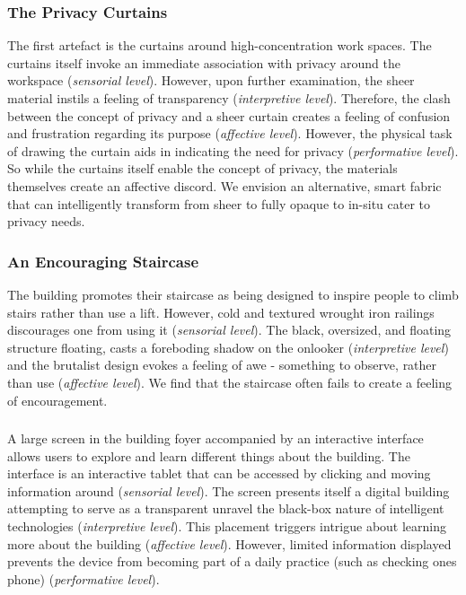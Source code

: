 \documentclass[manuscript, anonymous, review]{acmart}
\begin{document}
\subsubsection*{The Privacy Curtains}
The first artefact is the curtains around high-concentration work spaces. The curtains itself invoke an immediate association with privacy around the workspace (\textit{sensorial level}). However, upon further examination, the sheer material instils a feeling of transparency (\textit{interpretive level}). Therefore, the clash between the concept of privacy and a sheer curtain creates a feeling of confusion and frustration regarding its purpose (\textit{affective level}). However, the physical task of drawing the curtain aids in indicating the need for privacy (\textit{performative level}). So while the curtains itself enable the concept of privacy, the materials themselves create an affective discord. We envision an alternative, smart fabric that can intelligently transform from sheer to fully opaque to in-situ cater to privacy needs.

\subsubsection*{An Encouraging Staircase}
The building promotes their staircase as being designed to inspire people to climb stairs rather than use a lift. However, cold and textured wrought iron railings discourages one from using it (\textit{sensorial level}). The black, oversized, and floating structure floating, casts a foreboding  shadow on the onlooker  (\textit{interpretive level}) and the brutalist design evokes a feeling of awe - something to observe, rather than use (\textit{affective level}). We find that the staircase often fails to create a feeling of encouragement.

\subsubsection*{}
A large screen in the building foyer accompanied by an interactive interface allows users to explore and learn different things about the building. The interface is an interactive tablet that can be accessed by clicking and moving information around (\textit{sensorial level}). The screen presents itself a digital building attempting to serve as a transparent unravel the black-box  nature of intelligent technologies (\textit{interpretive level}). This placement triggers intrigue about learning more about the building (\textit{affective level}). However, limited information displayed prevents the device from becoming part of a daily practice (such as checking ones phone) (\textit{performative level}). 
\end{document}

